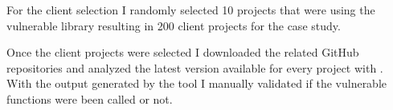 For the client selection I randomly selected 10 projects that were using the vulnerable library resulting in 200 client projects for the case study. 

Once the client projects were selected I downloaded the related GitHub repositories and analyzed the latest version available for every project with \tool[]. With the output generated by the tool I manually validated if the vulnerable functions were been called or not.